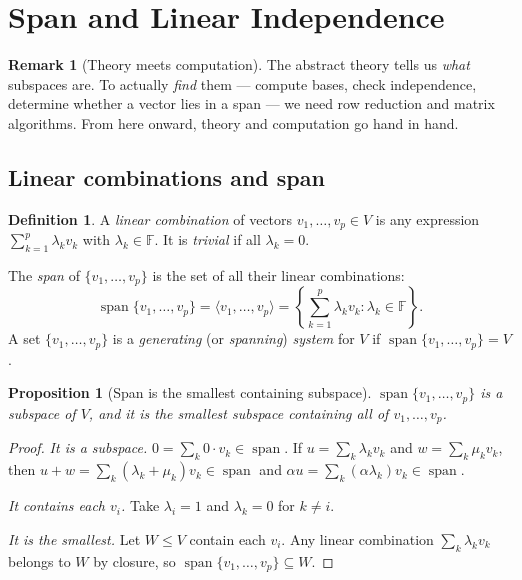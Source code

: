 \documentclass[11pt]{article}
\theoremstyle{definition}
\newtheorem{definition}{Definition}[section]
\newtheorem{remark}{Remark}[section]
\theoremstyle{plain}
\newtheorem{proposition}{Proposition}[section]
\begin{document}
\section{Span and Linear Independence}

\begin{remark}[Theory meets computation]
  The abstract theory tells us \emph{what} subspaces are.  To actually
  \emph{find} them --- compute bases, check independence, determine whether
  a vector lies in a span --- we need row reduction and matrix algorithms.
  From here onward, theory and computation go hand in hand.
\end{remark}

\subsection{Linear combinations and span}

\begin{definition}
  A \emph{linear combination} of vectors $v_1,\ldots,v_p\in V$ is any
  expression $\sum_{k=1}^p \lambda_k v_k$ with $\lambda_k\in\mathbb{F}$.
  It is \emph{trivial} if all $\lambda_k = 0$.

  The \emph{span} of $\{v_1,\ldots,v_p\}$ is the set of all their linear
  combinations:
  \[
    \operatorname{span}\{v_1,\ldots,v_p\}
    = \langle v_1,\ldots,v_p\rangle
    = \left\{\sum_{k=1}^p \lambda_k v_k : \lambda_k\in\mathbb{F}\right\}.
  \]
  A set $\{v_1,\ldots,v_p\}$ is a \emph{generating} (or \emph{spanning})
  \emph{system} for $V$ if $\operatorname{span}\{v_1,\ldots,v_p\} = V$.
\end{definition}

\begin{proposition}[Span is the smallest containing subspace]
  $\operatorname{span}\{v_1,\ldots,v_p\}$ is a subspace of $V$, and it is
  the \emph{smallest} subspace containing all of $v_1,\ldots,v_p$.
\end{proposition}
\begin{proof}
  \textit{It is a subspace.}
  $0 = \sum_k 0\cdot v_k \in \operatorname{span}$.
  If $u = \sum_k \lambda_k v_k$ and $w = \sum_k \mu_k v_k$, then
  $u + w = \sum_k(\lambda_k+\mu_k)v_k \in \operatorname{span}$ and
  $\alpha u = \sum_k (\alpha\lambda_k)v_k \in \operatorname{span}$.

  \textit{It contains each $v_i$.}
  Take $\lambda_i = 1$ and $\lambda_k = 0$ for $k\ne i$.

  \textit{It is the smallest.}
  Let $W\le V$ contain each $v_i$.  Any linear combination
  $\sum_k \lambda_k v_k$ belongs to $W$ by closure, so
  $\operatorname{span}\{v_1,\ldots,v_p\}\subseteq W$.
\end{proof}
\end{document}
